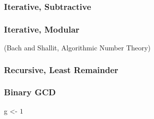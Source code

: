 \documentclass{beamer}
\begin{document}
\begin{frame}
\frametitle{Iterative, Subtractive}
\begin{algorithm}[H]
\begin{algorithmic}
\ENDIF
{}
	\ELSE
	\ENDIF
\ENDWHILE

\end{algorithmic}
\end{algorithm}
\end{frame}

\begin{frame}
\frametitle{Iterative, Modular}
\begin{algorithm}[H]
\begin{algorithmic}
\ENDIF
{}
\ENDWHILE
{}
\end{algorithmic}
\end{algorithm}
\indent (Bach and Shallit, Algorithmic Number Theory)
\end{frame}



\begin{frame}
\frametitle{Recursive, Least Remainder}
\begin{algorithm}[H]
\begin{algorithmic}
\ELSE
{}
\ENDIF

\end{algorithmic}
\end{algorithm}
\end{frame}

\begin{frame}
\frametitle{Binary GCD}
\begin{algorithm}[H]
\begin{algorithmic}
\STATE g \textless - $1$
\ENDWHILE

	\ELSE
		\ELSE
		\ENDIF
	\ENDIF
\ENDWHILE
{}

\end{algorithmic}
\end{algorithm}
\end{frame}
\end{document}
